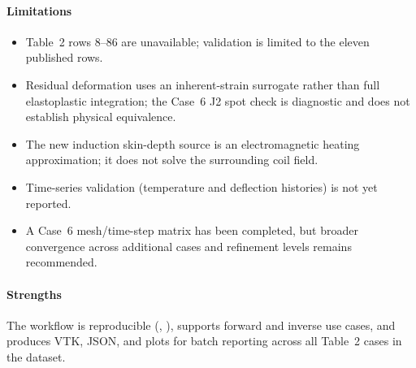 \paragraph{Limitations}
\begin{itemize}
  \item Table~2 rows 8--86 are unavailable; validation is limited to the eleven published rows.
  \item Residual deformation uses an inherent-strain surrogate rather than full elastoplastic integration; the Case~6 J2 spot check is diagnostic and does not establish physical equivalence.
  \item The new induction skin-depth source is an electromagnetic heating approximation; it does not solve the surrounding coil field.
  \item Time-series validation (temperature and deflection histories) is not yet reported.
  \item A Case~6 mesh/time-step matrix has been completed, but broader convergence across additional cases and refinement levels remains recommended.
\end{itemize}

\paragraph{Strengths}
The workflow is reproducible (, ), supports forward and inverse use cases, and produces VTK, JSON, and plots for batch reporting across all Table~2 cases in the dataset.
